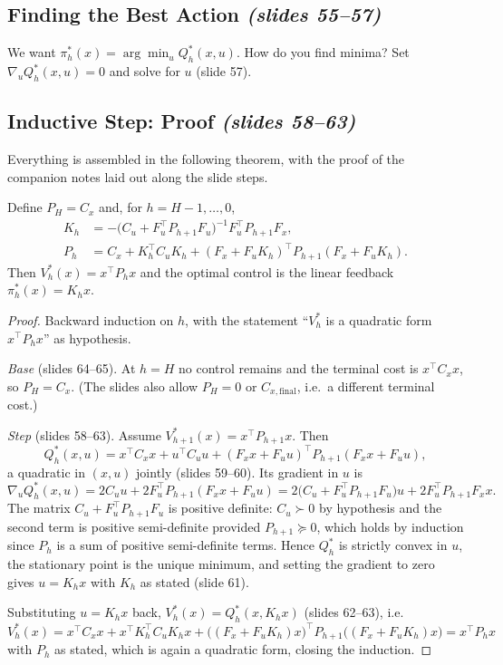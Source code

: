 \documentclass[11pt,a4paper]{article}
\newcommand{\slides}[1]{\emph{(slides #1)}}
\theoremstyle{plain}
\theoremstyle{definition}
\theoremstyle{remark}
\begin{document}
\subsection{Finding the Best Action \slides{55--57}}

We want $\pi^*_h(x)=\arg\min_uQ^*_h(x,u)$. How do you find minima? Set $\nabla_uQ^*_h(x,u)=0$ and solve for $u$ (slide 57).

\subsection{Inductive Step: Proof \slides{58--63}}

Everything is assembled in the following theorem, with the proof of the companion notes laid out along the slide steps.

\begin{theorem}\label{thm:lqr}
Define $P_H=C_x$ and, for $h=H-1,\dots,0$,
\begin{align*}
K_h&=-\big(C_u+F_u^\top P_{h+1}F_u\big)^{-1}F_u^\top P_{h+1}F_x,\\
P_h&=C_x+K_h^\top C_uK_h+(F_x+F_uK_h)^\top P_{h+1}(F_x+F_uK_h).
\end{align*}
Then $V^*_h(x)=x^\top P_hx$ and the optimal control is the linear feedback $\pi^*_h(x)=K_hx$.
\end{theorem}
\begin{proof}
Backward induction on $h$, with the statement ``$V^*_h$ is a quadratic form $x^\top P_hx$'' as hypothesis.

\emph{Base} (slides 64--65). At $h=H$ no control remains and the terminal cost is $x^\top C_xx$, so $P_H=C_x$. (The slides also allow $P_H=0$ or $C_{x,\mathrm{final}}$, i.e.\ a different terminal cost.)

\emph{Step} (slides 58--63). Assume $V^*_{h+1}(x)=x^\top P_{h+1}x$. Then
\[
Q^*_h(x,u)=x^\top C_xx+u^\top C_uu+(F_xx+F_uu)^\top P_{h+1}(F_xx+F_uu),
\]
a quadratic in $(x,u)$ jointly (slides 59--60). Its gradient in $u$ is
\[
\nabla_uQ^*_h(x,u)=2C_uu+2F_u^\top P_{h+1}(F_xx+F_uu)=2\big(C_u+F_u^\top P_{h+1}F_u\big)u+2F_u^\top P_{h+1}F_xx.
\]
The matrix $C_u+F_u^\top P_{h+1}F_u$ is positive definite: $C_u\succ0$ by hypothesis and the second term is positive semi-definite provided $P_{h+1}\succeq0$, which holds by induction since $P_h$ is a sum of positive semi-definite terms. Hence $Q^*_h$ is strictly convex in $u$, the stationary point is the unique minimum, and setting the gradient to zero gives $u=K_hx$ with $K_h$ as stated (slide 61).

Substituting $u=K_hx$ back, $V^*_h(x)=Q^*_h(x,K_hx)$ (slides 62--63), i.e.
\[
V^*_h(x)=x^\top C_xx+x^\top K_h^\top C_uK_hx+\big((F_x+F_uK_h)x\big)^\top P_{h+1}\big((F_x+F_uK_h)x\big)=x^\top P_hx
\]
with $P_h$ as stated, which is again a quadratic form, closing the induction.
\end{proof}
\end{document}
